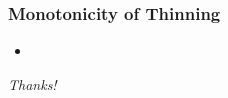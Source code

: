 \begin{frame}[c]
    \frametitle{Monotonicity of Thinning}
    \begin{itemize}
        \item 
    \end{itemize}
\end{frame}

\begin{frame}[c]{}
    \centering
    \Huge \emph{Thanks!}
\end{frame}

